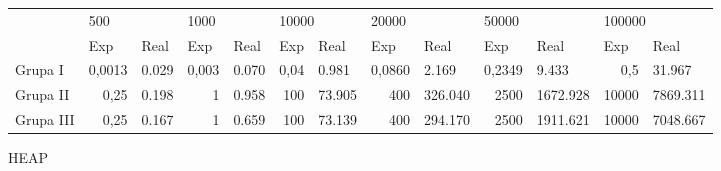 \documentclass{article}
\begin{document}
\begin{table}[H]
    \begin{tabular}{lrlrlrlrlrlrl}
                       & \multicolumn{2}{l}{500}         & \multicolumn{2}{l}{1000}        & \multicolumn{2}{l}{10000}            & \multicolumn{2}{l}{20000}         & \multicolumn{2}{l}{50000}          & \multicolumn{2}{l}{100000}         \\
    \multirow{-2}{*}{} & \multicolumn{1}{l}{Exp} & Real  & \multicolumn{1}{l}{Exp} & Real  & \multicolumn{1}{l}{Exp}     & Real   & \multicolumn{1}{l}{Exp} & Real    & \multicolumn{1}{l}{Exp} & Real     & \multicolumn{1}{l}{Exp} & Real     \\
    Grupa I            & 0,0013                  & 0.029 & 0,003                   & 0.070 & 0,04                        & 0.981  & 0,0860                  & 2.169   & 0,2349                  & 9.433    & 0,5                     & 31.967   \\
    Grupa II           & 0,25                    & 0.198 & 1                       & 0.958 & 100 & 73.905 & 400                     & 326.040 & 2500                    & 1672.928 & 10000                   & 7869.311 \\
    Grupa III          & 0,25                    & 0.167 & 1                       & 0.659 & 100 & 73.139 & 400                     & 294.170 & 2500                    & 1911.621 & 10000                   & 7048.667
    \end{tabular}
    \end{table}

HEAP
\end{document}
